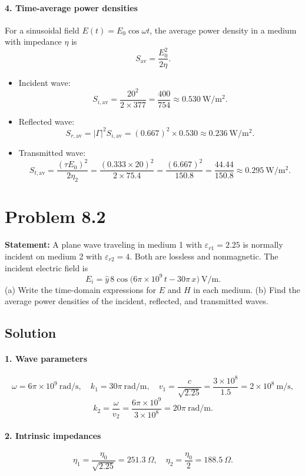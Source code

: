 \paragraph{4. Time-average power densities}
For a sinusoidal field $E(t)=E_0 \cos\omega t$, the average power density in a medium with impedance $\eta$ is
\[
S_{\mathrm{av}}
= \frac{E_0^2}{2 \eta}.
\]
\begin{itemize}
  \item Incident wave:
  \[
    S_{i,\mathrm{av}}
    = \frac{20^2}{2 \times 377}
    = \frac{400}{754}
    \approx 0.530\ \mathrm{W/m^2}.
  \]
  \item Reflected wave:
  \[
    S_{r,\mathrm{av}}
    = |\Gamma|^2 S_{i,\mathrm{av}}
    = (0.667)^2 \times 0.530
    \approx 0.236\ \mathrm{W/m^2}.
  \]
  \item Transmitted wave:
  \[
    S_{t,\mathrm{av}}
    = \frac{(\tau E_0)^2}{2 \eta_2}
    = \frac{(0.333 \times 20)^2}{2 \times 75.4}
    = \frac{(6.667)^2}{150.8}
    = \frac{44.44}{150.8}
    \approx 0.295\ \mathrm{W/m^2}.
  \]
\end{itemize}

\section*{Problem 8.2}
\textbf{Statement:} A plane wave traveling in medium 1 with $\varepsilon_{r1}=2.25$ is normally incident on medium 2 with $\varepsilon_{r2}=4$. Both are lossless and nonmagnetic. The incident electric field is
\[
E_i = \hat y\,8\cos\bigl(6\pi \times 10^9\,t - 30\pi\,x\bigr)\ \mathrm{V/m}.
\]
(a) Write the time-domain expressions for $E$ and $H$ in each medium. (b) Find the average power densities of the incident, reflected, and transmitted waves.

\subsection*{Solution}
\paragraph{1. Wave parameters}
\[
\omega = 6\pi \times 10^9\ \mathrm{rad/s},\quad
k_1 = 30\pi\ \mathrm{rad/m},\quad
v_1 = \frac{c}{\sqrt{2.25}}
      = \frac{3\times10^8}{1.5}
      = 2\times10^8\ \mathrm{m/s},
\]
\[
k_2 = \frac{\omega}{v_2}
      = \frac{6\pi \times 10^9}{3\times10^8}
      = 20\pi\ \mathrm{rad/m}.
\]

\paragraph{2. Intrinsic impedances}
\[
\eta_1 = \frac{\eta_0}{\sqrt{2.25}} = 251.3\ \Omega,
\quad
\eta_2 = \frac{\eta_0}{2} = 188.5\ \Omega.
\]


